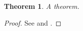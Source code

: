 \documentclass{article}
\newtheorem{theorem}{Theorem}
\begin{document}
\begin{theorem}\label{t}A theorem.\end{theorem}
\begin{proof}See \cite{knuth} and \cite{turing}.\end{proof}
\printbibliography
\end{document}
